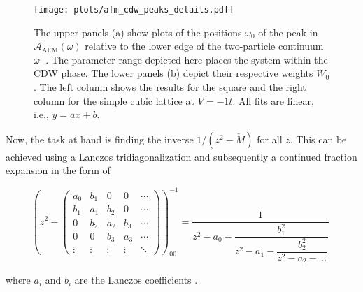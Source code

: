 \documentclass[
    reprint, 
    aps,
    preprintnumbers,
    twocolumn,
    prb,
    superscriptaddress
]{revtex4-2}
\newcommand{\spectral}[1]{\mathcal{A}_\text{#1}  (\omega)}
\begin{document}
\begin{figure}
    \centering
    \texttt{[image: plots/afm\_cdw\_peaks\_details.pdf]}
    \caption{The upper panels (a) show plots of the positions $\omega_0$ of the peak in $\spectral{AFM}$ relative to the lower edge of the two-particle continuum $\omega_-$.
    The parameter range depicted here places the system within the CDW phase.
    The lower panels (b) depict their respective weights $W_0$.
    The left column shows the results for the square and the right column for the simple cubic lattice at $V=-1t$.
    All fits are linear, i.e., $y=ax + b$.}
    \label{fig:afm_cdw_peaks_details}
\end{figure}


Now, the task at hand is finding the inverse $1/(z^2 - \check{M})$ for all $z$.
This can be achieved using a Lanczos tridiagonalization and subsequently a continued fraction expansion in the form of

\begin{widetext}
\begin{equation}
    \left( z^2 - \begin{pmatrix}
        a_0 & b_1 & 0 & 0 & \cdots \\
        b_1 & a_1 & b_2 & 0 & \cdots \\
        0 & b_2 & a_2 & b_3 & \cdots \\
        0 & 0 & b_3 & a_3 & \cdots \\
        \vdots & \vdots & \vdots & \vdots & \ddots
    \end{pmatrix} \right)_{00}^{-1} = \dfrac{1}{z^2 - a_0 - \dfrac{b_1^2}{z^2 - a_1 - \dfrac{b_2^2}{ z^2 - a_2 - \hdots}}}\,\,
\end{equation}
\end{widetext}

where $a_i$ and $b_i$ are the Lanczos coefficients \cite{PettiforRecursion,ViswanathRecursion}.
\end{document}

